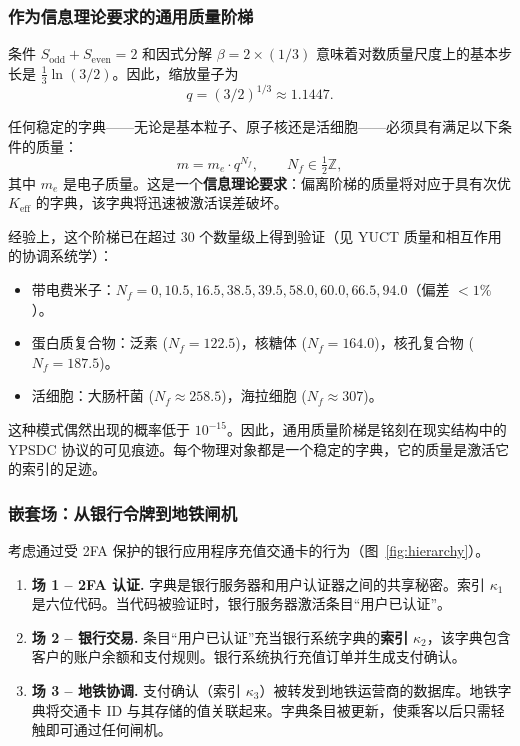 \documentclass[12pt,a4paper]{article}
\theoremstyle{remark}
\begin{document}
	\subsubsection{作为信息理论要求的通用质量阶梯}
	
	条件 \(S_{\mathrm{odd}} + S_{\mathrm{even}} = 2\) 和因式分解 \(\beta = 2 \times (1/3)\) 意味着对数质量尺度上的基本步长是 \(\frac{1}{3}\ln(3/2)\)。因此，缩放量子为
	\[
	q = (3/2)^{1/3} \approx 1.1447.
	\]
	
	任何稳定的字典——无论是基本粒子、原子核还是活细胞——必须具有满足以下条件的质量：
	\[
	m = m_e \cdot q^{N_f}, \qquad N_f \in \tfrac{1}{2}\mathbb{Z},
	\]
	其中 \(m_e\) 是电子质量。这是一个\textbf{信息理论要求}：偏离阶梯的质量将对应于具有次优 \(K_{\mathrm{eff}}\) 的字典，该字典将迅速被激活误差破坏。
	
	经验上，这个阶梯已在超过 30 个数量级上得到验证（见 YUCT 质量和相互作用的协调系统学）：
	\begin{itemize}
		\item 带电费米子：\(N_f = 0, 10.5, 16.5, 38.5, 39.5, 58.0, 60.0, 66.5, 94.0\)（偏差 \(< 1\%\)）。
		\item 蛋白质复合物：泛素 (\(N_f = 122.5\))，核糖体 (\(N_f = 164.0\))，核孔复合物 (\(N_f = 187.5\))。
		\item 活细胞：大肠杆菌 (\(N_f \approx 258.5\))，海拉细胞 (\(N_f \approx 307\))。
	\end{itemize}
	
	这种模式偶然出现的概率低于 \(10^{-15}\)。因此，通用质量阶梯是铭刻在现实结构中的 YPSDC 协议的可见痕迹。每个物理对象都是一个稳定的字典，它的质量是激活它的索引的足迹。
	
	\subsubsection{嵌套场：从银行令牌到地铁闸机}
	
	考虑通过受 2FA 保护的银行应用程序充值交通卡的行为（图~\ref{fig:hierarchy}）。
	
	\begin{enumerate}[leftmargin=*]
		\item \textbf{场 1 – 2FA 认证.}
		字典是银行服务器和用户认证器之间的共享秘密。索引 $\kappa_1$ 是六位代码。当代码被验证时，银行服务器激活条目“用户已认证”。
		
		\item \textbf{场 2 – 银行交易.}
		条目“用户已认证”充当银行系统字典的\textbf{索引} $\kappa_2$，该字典包含客户的账户余额和支付规则。银行系统执行充值订单并生成支付确认。
		
		\item \textbf{场 3 – 地铁协调.}
		支付确认（索引 $\kappa_3$）被转发到地铁运营商的数据库。地铁字典将交通卡 ID 与其存储的值关联起来。字典条目被更新，使乘客以后只需轻触即可通过任何闸机。
	\end{enumerate}
	
\end{document}
